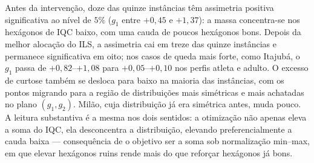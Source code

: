 \documentclass[11pt,a4paper]{article}
\begin{document}
Antes da intervenção, doze das quinze instâncias têm assimetria positiva significativa ao nível de $5\%$ ($g_1$ entre $+0{,}45$ e $+1{,}37$): a massa concentra-se nos hexágonos de IQC baixo, com uma cauda de poucos hexágonos bons. Depois da melhor alocação do ILS, a assimetria cai em treze das quinze instâncias e permanece significativa em oito; nos casos de queda mais forte, como Itajubá, o $g_1$ passa de $+0{,}82$--$+1{,}08$ para $+0{,}05$--$+0{,}10$ nos perfis atleta e adulto. O excesso de curtose também se desloca para baixo na maioria das instâncias, com os pontos migrando para a região de distribuições mais simétricas e mais achatadas no plano $(g_1, g_2)$. Milão, cuja distribuição já era simétrica antes, muda pouco. A leitura substantiva é a mesma nos dois sentidos: a otimização não apenas eleva a soma do IQC, ela desconcentra a distribuição, elevando preferencialmente a cauda baixa — consequência de o objetivo ser a soma sob normalização min--max, em que elevar hexágonos ruins rende mais do que reforçar hexágonos já bons.
\end{document}
